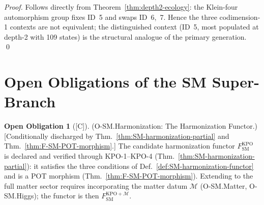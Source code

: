 \documentclass[12pt,oneside]{amsbook}
\theoremstyle{plain}
\theoremstyle{definition}
\newtheorem{obligation}[theorem]{Open Obligation}
\theoremstyle{remark}
\newcommand{\status}[1]{\textup{[#1]}}
\begin{document}
\begin{proof}
Follows directly from Theorem~\ref{thm:depth2-ecology}:
the Klein-four automorphism group fixes ID~5 and swaps ID~6,~7.
Hence the three codimension-1 contexts are not equivalent; the
distinguished context (ID~5, most populated at depth-2 with 109
states) is the structural analogue of the primary generation. \qed
\end{proof}

\section{Open Obligations of the SM Super-Branch}
\label{sec:sm-obligations}

\begin{obligation}[\status{C}]\label{ob:SM-harmonization}
\textup{(O-SM.Harmonization: The Harmonization Functor.)}
\textup{[Conditionally discharged by
Thm.~\ref{thm:SM-harmonization-partial}
and Thm.~\ref{thm:F-SM-POT-morphism}.]}
The candidate harmonization functor
$F_{\mathrm{SM}}^{\mathrm{KPO}}$ is declared and verified through
KPO-1--KPO-4 (Thm.~\ref{thm:SM-harmonization-partial}): it satisfies
the three conditions of Def.~\ref{def:SM-harmonization-functor} and
is a POT morphism (Thm.~\ref{thm:F-SM-POT-morphism}).
Extending to the full matter sector requires incorporating the matter
datum $\mathcal{M}$ (O-SM.Matter, O-SM.Higgs); the functor is then
$F_{\mathrm{SM}}^{\mathrm{KPO}+\mathcal{M}}$.
\end{obligation}
\end{document}
